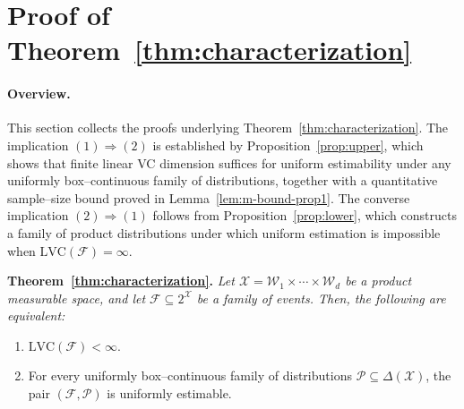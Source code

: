 \documentclass[arxiv]{colt2026}
\newenvironment{restatedtheorem}[1]
  {\par\noindent\textbf{Theorem~\ref{#1}.}\itshape}
  {\par}
\newcommand{\X}{\mathcal{X}}
\newcommand{\F}{\mathcal{F}}
\newcommand{\W}{\mathcal{W}}
\newcommand{\Pc}{\mathcal{P}}
\newcommand{\eps}{\varepsilon}
\newcommand{\LVC}{\mathrm{LVC}}
\begin{document}


\appendix
\section{Proof of Theorem~\ref{thm:characterization}}\label{sec:proof-main}

\paragraph{Overview.}
This section collects the proofs underlying
Theorem~\ref{thm:characterization}.
The implication $(1)\Rightarrow(2)$ is established by
Proposition~\ref{prop:upper}, which shows that finite linear VC dimension
suffices for uniform estimability under any uniformly box--continuous family
of distributions, together with a quantitative sample--size bound proved in
Lemma~\ref{lem:m-bound-prop1}.
The converse implication $(2)\Rightarrow(1)$ follows from
Proposition~\ref{prop:lower}, which constructs a family of product
distributions under which uniform estimation is impossible when
$\LVC(\F)=\infty$.


\begin{restatedtheorem}{thm:characterization}
Let $\X = \W_1 \times \cdots \times \W_d$ be a product measurable space, and let
$\F \subseteq 2^{\X}$ be a family of events.
Then, the following are equivalent:
\begin{enumerate}
\item $\LVC(\F) < \infty$.
\item For every uniformly box--continuous family of distributions
$\Pc \subseteq \Delta(\X)$, the pair $(\F,\Pc)$ is uniformly estimable.
\end{enumerate}
\end{restatedtheorem}
\end{document}
